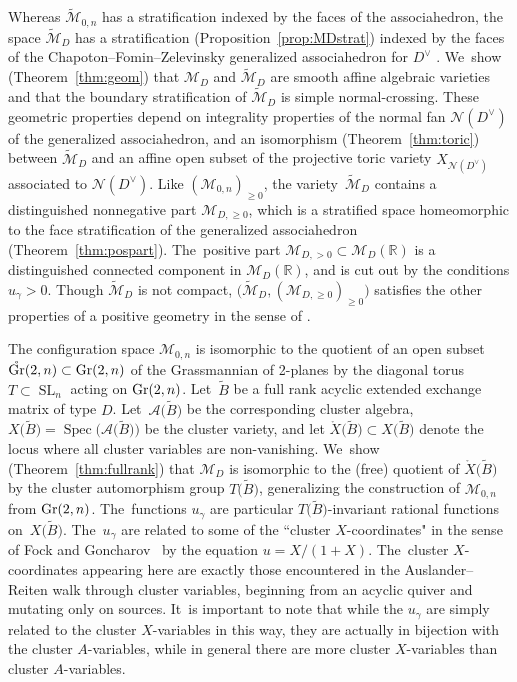 \documentclass[10pt,a4paper]{amsart}
\def\R{{\mathbb R}}
\def\A{{\mathcal{A}}}
\def\Gr{{\rm Gr}}
\def\oGr{{\mathring{\Gr}}}
\def\Xo{{\mathring{X}}}
\def\Spec{\operatorname{Spec}}
\def\tB{{\tilde B}}
\def\M{{\mathcal{M}}}
\def\tM{{\widetilde {\mathcal{M}}}}
\def\tB{{\tilde B}}
\def\N{{\mathcal{N}}}
\def\SL{\operatorname{SL}}
\numberwithin{equation}{section}
\begin{document}
Whereas $\tM_{0,n}$ has a stratification indexed by the faces of the associahedron, the space $\tM_D$ has a stratification (Proposition~\ref{prop:MDstrat}) indexed by the faces of the Chapoton--Fomin--Zelevinsky generalized associahedron for $D^\vee$ \cite{CFZ,FZY}. We~show (Theorem~\ref{thm:geom}) that $\M_D$ and $\tM_D$ are smooth affine algebraic varieties and that the boundary stratification of $\tM_D$ is simple normal-crossing. These geometric properties depend on integrality properties of the normal fan $\N(D^\vee)$ of the generalized associahedron, and an isomorphism (Theorem~\ref{thm:toric}) between $\tM_D$ and an affine open subset of the projective toric variety $X_{\N(D^\vee)}$ associated to $\N(D^\vee)$. Like $(\M_{0,n})_{\geq 0}$, the variety~$\tM_D$ contains a distinguished nonnegative part $\M_{D,\geq 0}$, which is a stratified space homeomorphic to the face stratification of the generalized associahedron (Theorem~\ref{thm:pospart}). The~positive part $\M_{D, > 0} \subset \M_D(\R)$ is a distinguished connected component in $\M_D(\R)$, and is cut out by the conditions $u_\gamma >0$. Though $\tM_D$ is not compact, $\big(\tM_D,(\M_{D, \geq 0})_{\geq 0}\big)$ satisfies the other properties of a positive geometry in the sense of \cite{ABL}.

\bigskip{} The configuration space $\M_{0,n}$ is isomorphic to the quotient of an open subset $\oGr(2,n) \subset \Gr(2,n)$ of the Grassmannian of 2-planes by the diagonal torus $T \subset \SL_n$ acting on $\Gr(2,n)$. Let~$\tB$ be a full rank acyclic extended exchange matrix of type $D$. Let~$\A\big(\tB\big)$ be the corresponding cluster algebra, $X\big(\tB\big) = \Spec\big(\A\big(\tB\big)\big)$ be the cluster variety, and let $\Xo\big(\tB\big) \subset X\big(\tB\big)$ denote the locus where all cluster variables are non-vanishing. We~show (Theorem~\ref{thm:fullrank}) that $\M_D$ is isomorphic to the (free) quotient of $\Xo\big(\tB\big)$ by the cluster automorphism group $T\big(\tB\big)$, generalizing the construction of $\M_{0,n}$ from $\Gr(2,n)$. The~functions $u_\gamma$ are particular $T\big(\tB\big)$-invariant rational functions on~$X\big(\tB\big)$. The~$u_\gamma$ are related to some of the ``cluster $X$-coordinates" in the sense of Fock and Goncharov~\cite{FG} by the equation $u = X/(1+X)$. The~cluster $X$-coordinates appearing here are exactly those encountered in the Auslander--Reiten walk through cluster variables, beginning from an acyclic quiver and mutating only on sources. It~is important to note that while the $u_\gamma$ are simply related to the cluster $X$-variables in this way, they are actually in bijection with the cluster $A$-variables, while in general there are more cluster $X$-variables than cluster $A$-variables.
\end{document}
